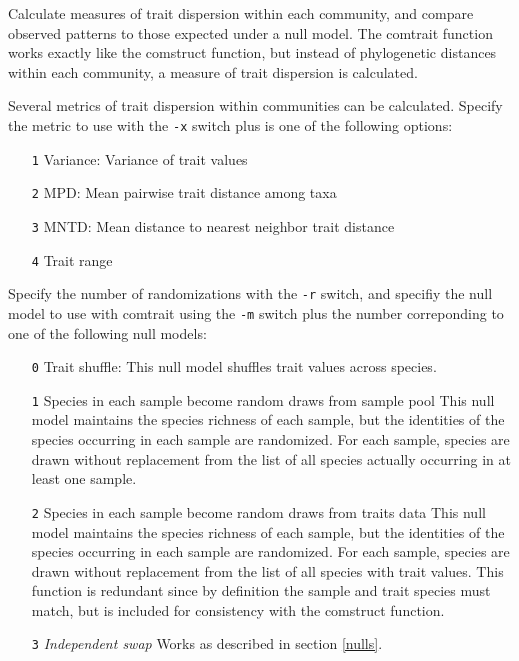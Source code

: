 \documentclass[12pt,letterpaper]{article}
\begin{document}
Calculate measures of trait dispersion within each community, and
compare observed patterns to those expected under a null model. The
comtrait function works exactly like the comstruct function, but
instead of phylogenetic distances within each community, a measure of
trait dispersion is calculated.

Several metrics of trait dispersion within communities can be
calculated. Specify the metric to use with the \verb|-x| switch plus
is one of the following options:

\begin{itemize}
\item[\texttt{1}] Variance: Variance of trait values
\item[\texttt{2}] MPD: Mean pairwise trait distance among taxa
\item[\texttt{3}] MNTD: Mean distance to nearest neighbor trait distance
\item[\texttt{4}] Trait range
\end{itemize}

Specify the number of randomizations with the \verb|-r| switch, and
specifiy the null model to use with comtrait using the \verb|-m|
switch plus the number correponding to one of the following null
models:

\begin{itemize}
\item[\texttt{0}] Trait shuffle: This null model shuffles trait values
  across species.
\item[\texttt{1}] Species in each sample become random draws from
  sample pool This null model maintains the species richness of each
  sample, but the identities of the species occurring in each sample
  are randomized. For each sample, species are drawn without
  replacement from the list of all species actually occurring in at
  least one sample.
\item[\texttt{2}] Species in each sample become random draws from
  traits data This null model maintains the species richness of each
  sample, but the identities of the species occurring in each sample
  are randomized. For each sample, species are drawn without
  replacement from the list of all species with trait values. This
  function is redundant since by definition the sample and trait
  species must match, but is included for consistency with the
  comstruct function.
\item[\texttt{3}] \textit{Independent swap} Works as described in
  section \ref{nulls}.
\end{itemize}
\end{document}
